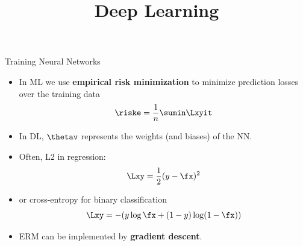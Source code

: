 




\newcommand{\titlefigure}{figure/loss_surface.png}
\newcommand{\learninggoals}{
  \item Empirical risk minimization
  \item Gradient descent
  \item Stochastic gradient descent
}

\title{Deep Learning}
\date{}




\begin{vbframe}{Training Neural Networks}


\begin{itemize}
\item
In ML we use \textbf{empirical risk minimization} to minimize prediction 
losses over the training data
$$\riske = \frac{1}{n} \sumin \Lxyit$$
\item In DL, $\thetav$ represents the weights (and biases) of the NN. 
\item Often, L2 in regression:
$$\Lxy = \frac{1}{2}(y - \fx)^2$$
\item or cross-entropy for binary classification
$$\Lxy = - (y \log \fx + (1 - y) \log(1 - \fx))$$
 \item ERM can be implemented by \textbf{gradient descent}.
\end{itemize}
\end{vbframe}

